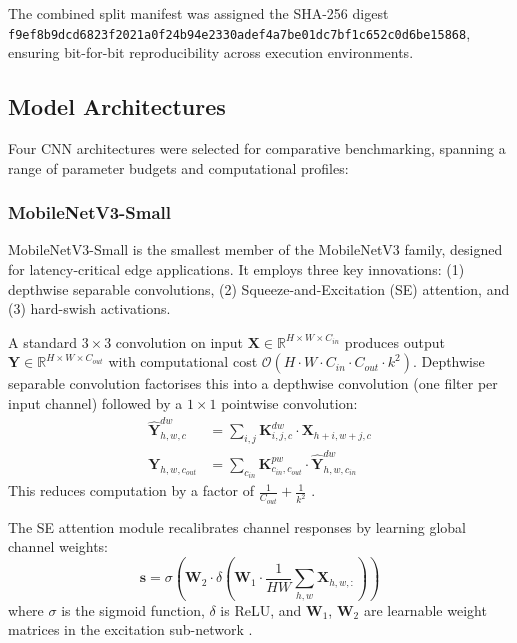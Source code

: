 \documentclass[pdflatex,sn-mathphys-num]{sn-jnl}
\theoremstyle{thmstyleone}%
\theoremstyle{thmstyletwo}%
\theoremstyle{thmstylethree}%
\begin{document}
The combined split manifest was assigned the SHA-256 digest
\texttt{f9ef8b9dcd6823f2021a0f24b94e2330adef4a7be01dc7bf1c652c0d6be15868}, ensuring
bit-for-bit reproducibility across execution environments.

\subsection{Model Architectures}
\label{sec:models}

Four CNN architectures were selected for comparative benchmarking, spanning a range of
parameter budgets and computational profiles:

\subsubsection{MobileNetV3-Small}

MobileNetV3-Small \citep{howard2019mobilenetv3} is the smallest member of the MobileNetV3
family, designed for latency-critical edge applications. It employs three key
innovations: (1) depthwise separable convolutions, (2) Squeeze-and-Excitation (SE)
attention, and (3) hard-swish activations.

A standard $3\times3$ convolution on input $\mathbf{X} \in \mathbb{R}^{H \times W \times C_{in}}$
produces output $\mathbf{Y} \in \mathbb{R}^{H \times W \times C_{out}}$ with computational
cost $\mathcal{O}(H \cdot W \cdot C_{in} \cdot C_{out} \cdot k^2)$. Depthwise separable
convolution factorises this into a depthwise convolution (one filter per input channel)
followed by a $1\times1$ pointwise convolution:
\begin{align}
  \hat{\mathbf{Y}}^{dw}_{h,w,c} &= \sum_{i,j} \mathbf{K}^{dw}_{i,j,c} \cdot \mathbf{X}_{h+i, w+j, c}
  \label{eq:dw_conv} \\
  \mathbf{Y}_{h,w,c_{out}} &= \sum_{c_{in}} \mathbf{K}^{pw}_{c_{in},c_{out}} \cdot
  \hat{\mathbf{Y}}^{dw}_{h,w,c_{in}}
  \label{eq:pw_conv}
\end{align}
This reduces computation by a factor of $\frac{1}{C_{out}} + \frac{1}{k^2}$
\citep{howard2017mobilenets}.

The SE attention module recalibrates channel responses by learning global channel weights:
\begin{equation}
  \mathbf{s} = \sigma\!\left( \mathbf{W}_2 \cdot \delta\!\left( \mathbf{W}_1 \cdot
  \frac{1}{HW}\sum_{h,w} \mathbf{X}_{h,w,:} \right) \right)
  \label{eq:se}
\end{equation}
where $\sigma$ is the sigmoid function, $\delta$ is ReLU, and $\mathbf{W}_1$,
$\mathbf{W}_2$ are learnable weight matrices in the excitation sub-network
\citep{hu2018squeeze}.
\end{document}
